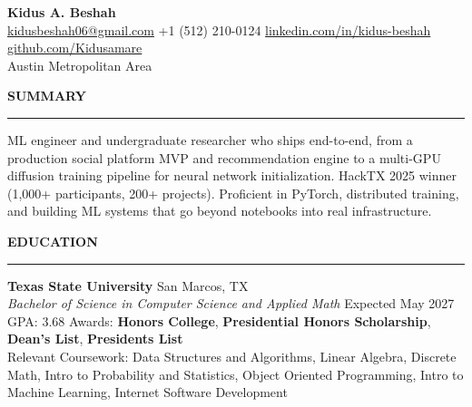 \documentclass[10pt, letterpaper]{article}
\newenvironment{header}{
    \setlength{\topsep}{0pt}\par\kern\topsep\centering\linespread{1.0}
}{
    \par\kern\topsep
} %
\begin{document}
    \newcommand{\AND}{\unskip
        \cleaders\copy\ANDbox\hskip\wd\ANDbox
        \ignorespaces
    }
    \newsavebox\ANDbox
    \sbox\ANDbox{$|$}

    \begin{header}
      {\LARGE \textbf{Kidus A. Beshah}} \\
      \vspace{0pt}
      {\normalsize
        \href{mailto:kidusbeshah06@gmail.com}{kidusbeshah06@gmail.com} \quad\textbar\quad
        +1 (512) 210-0124 \quad\textbar\quad
        \href{https://linkedin.com/in/kidus-beshah/}{linkedin.com/in/kidus-beshah} \quad\textbar\quad
        \href{https://github.com/Kidusamare}{github.com/Kidusamare} \\
        Austin Metropolitan Area
      } \\
    \end{header}

    \vspace{-0.15cm}

    {\bfseries SUMMARY} \\
    \vspace{2pt}
    \hrule
    \vspace{2pt}
    ML engineer and undergraduate researcher who ships end-to-end, from a production social platform MVP and recommendation engine to a multi-GPU diffusion training pipeline for neural network initialization. HackTX 2025 winner (1,000+ participants, 200+ projects). Proficient in PyTorch, distributed training, and building ML systems that go beyond notebooks into real infrastructure.
    \vspace{6pt}

    {\bfseries EDUCATION} \\
    \vspace{2pt}
    \hrule
    \vspace{2pt}
    {\textbf{Texas State University}} \hfill San Marcos, TX \\
    \textit{Bachelor of Science in Computer Science and Applied Math} \hfill Expected May 2027 \\
    GPA: 3.68 \quad\textbar\quad Awards: \textbf{Honors College}, \textbf{Presidential Honors Scholarship}, \textbf{Dean's List}, \textbf{Presidents List} \\
    Relevant Coursework: Data Structures and Algorithms, Linear Algebra, Discrete Math, Intro to Probability and Statistics, Object Oriented Programming, Intro to Machine Learning, Internet Software Development
    \vspace{6pt}
\end{document}
